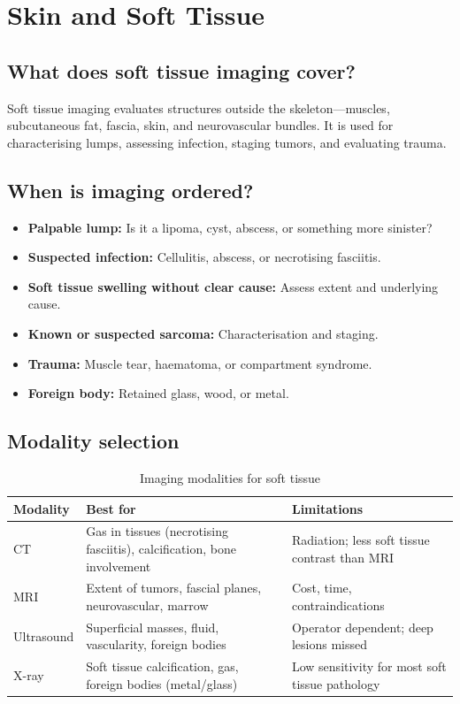 \chapter{Skin and Soft Tissue}

\label{ch:ch55_skin_soft_tissue}

\section{What does soft tissue imaging cover?}
Soft tissue imaging evaluates structures outside the skeleton---muscles, subcutaneous fat, fascia, skin, and neurovascular bundles. It is used for characterising lumps, assessing infection, staging tumors, and evaluating trauma.

\section{When is imaging ordered?}
\begin{itemize}
    \item \textbf{Palpable lump:} Is it a lipoma, cyst, abscess, or something more sinister?
    \item \textbf{Suspected infection:} Cellulitis, abscess, or necrotising fasciitis.
    \item \textbf{Soft tissue swelling without clear cause:} Assess extent and underlying cause.
    \item \textbf{Known or suspected sarcoma:} Characterisation and staging.
    \item \textbf{Trauma:} Muscle tear, haematoma, or compartment syndrome.
    \item \textbf{Foreign body:} Retained glass, wood, or metal.
\end{itemize}

\section{Modality selection}

\begin{table}[h]
\centering
\caption{Imaging modalities for soft tissue}
\label{tab:st_modality}
\begin{tabular}{@{}p{}p{}p{}@{}}
\hline
\textbf{Modality} & \textbf{Best for} & \textbf{Limitations} \\
\hline
CT & Gas in tissues (necrotising fasciitis), calcification, bone involvement & Radiation; less soft tissue contrast than MRI \\
MRI & Extent of tumors, fascial planes, neurovascular, marrow & Cost, time, contraindications \\
Ultrasound & Superficial masses, fluid, vascularity, foreign bodies & Operator dependent; deep lesions missed \\
X-ray & Soft tissue calcification, gas, foreign bodies (metal/glass) & Low sensitivity for most soft tissue pathology \\
\hline
\end{tabular}
\end{table}

